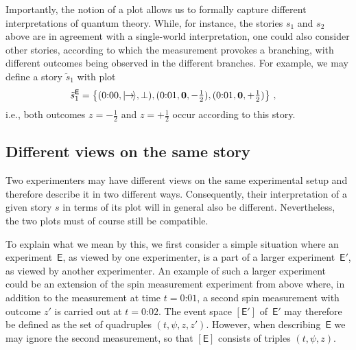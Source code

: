 \documentclass[12pt]{article}
\theoremstyle{plain}
\theoremstyle{definition}
\newcommand*{\ket}[1]{{| #1 \rangle}}
\newcommand*{\Exp}{\mathsf{E}}
\newcommand*{\Expp}{\mathsf{E'}}
\newcommand*{\spinright}{\ket{{\hspace{-0.2ex}\rightarrow\hspace{-0.4ex}}}}
\newcommand*{\sminus}{{\textstyle - \frac{1}{2}}}
\newcommand*{\splus}{{\textstyle + \frac{1}{2}}}
\begin{document}
Importantly, the notion of a plot allows us to formally capture  different interpretations of quantum theory.  While, for instance, the stories $s_1$ and $s_2$ above are in agreement with a single-world interpretation, one could also consider other stories, according to which the measurement provokes a branching, with different outcomes being observed in the different branches. For example, we may define a story $\tilde{s}_1$ with plot
\begin{align*}
  \tilde{s}_1^{\Exp} & =  \bigl\{ (\text{0:00}, \spinright, \bot),  (\text{0:01}, \mathbf{0},  \sminus), (\text{0:01}, \mathbf{0},  \splus)  \bigr\} \ ,
\end{align*}
i.e., both outcomes $z = \sminus$ and $z = \splus$ occur according to this story. 


\subsection{Different views on the same story} \label{sec_views}

Two experimenters may have different views on the same experimental setup and therefore describe it in two different ways. Consequently, their interpretation of a given story $s$ in terms of its plot will in general also be different. Nevertheless, the two plots must of course still be compatible. 


To explain what we mean by this, we first  consider a simple situation where an experiment~$\Exp$, as viewed by one experimenter,  is a part of a larger experiment~$\Expp$, as viewed by another experimenter. An example of such a larger experiment could be an  extension of the spin measurement experiment from above where, in addition to the measurement at time $t = \text{0:01}$, a second spin measurement with outcome $z'$ is carried out at $t = \text{0:02}$.  The event space $[\Expp]$ of~$\Expp$ may therefore be defined as the set of  quadruples $(t, \psi, z, z')$. However, when describing~$\Exp$ we may ignore the second measurement, so that $[\Exp]$ consists of triples $(t, \psi, z)$. 
\end{document}

